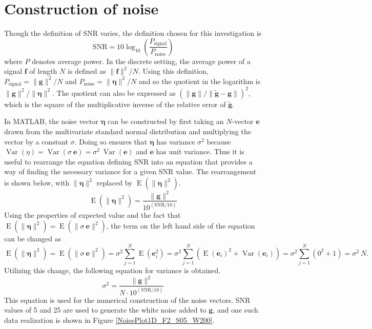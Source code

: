 \documentclass[12pt]{book}
\newcommand{\gVec}{\mathbf{g}}	%
\newcommand{\gnoiseVec}{\widetilde{\mathbf{g}}}	%
\newcommand{\noise}{\eta}	%
\newcommand{\noiseSD}{\sigma}	%
\newcommand{\noiseVec}{\bm{\noise}}	%
\DeclareMathOperator{\Var}{Var}	%
\DeclareMathOperator{\E}{E}	%
\begin{document}
\section{Construction of noise} \label{sec:Construction of noise}

Though the definition of SNR varies, the definition chosen for this investigation is
\begin{equation}
\label{eq:SNR}
\text{SNR} = 10\log_{10}\left(\frac{P_{\text{signal}}}{P_{\text{noise}}}\right)
\end{equation}
where $P$ denotes average power. In the discrete setting, the average power of a signal $\mathbf{f}$ of length $N$ is defined as $\|\mathbf{f}\|^2/N$. Using this definition, $P_{\text{signal}} = \|\gVec\|^2/N$ and $P_{\text{noise}} = \|\noiseVec\|^2/N$ and so the quotient in the logarithm is $\|\gVec\|^2/\|\noiseVec\|^2$. The quotient can also be expressed as $(\|\gVec\|/\|\gnoiseVec - \gVec\|)^2$, which is the square of the multiplicative inverse of the relative error of $\gnoiseVec$. \par
In MATLAB, the noise vector $\noiseVec$ can be constructed by first taking an $N$-vector $\mathbf{e}$ drawn from the multivariate standard normal distribution and multiplying the vector by a constant $\noiseSD$. Doing so ensures that $\noiseVec$ has variance $\noiseSD^2$ because $\Var(\noise) = \Var(\noiseSD\:\mathbf{e}) = \noiseSD^2\:\Var(\mathbf{e})$ and $\mathbf{e}$ has unit variance. Thus it is useful to rearrange the equation defining SNR into an equation that provides a way of finding the necessary variance for a given SNR value. The rearrangement is shown below, with $\|\noiseVec\|^2$ replaced by $\E(\|\noiseVec\|^2)$.
\[\E(\|\noiseVec\|^2) = \frac{\|\gVec\|^2}{10^{(\text{SNR}/10)}}\]
Using the properties of expected value and the fact that $\E(\|\noiseVec\|^2) = \E(\|\noiseSD\:\mathbf{e}\|^2)$, the term on the left hand side of the equation can be changed as
\[\E(\|\noiseVec\|^2) = \E(\|\noiseSD\:\mathbf{e}\|^2) = \noiseSD^2 \sum_{j=1}^N \E(\mathbf{e}_i^2) = \noiseSD^2 \sum_{j=1}^N \left(\E(\mathbf{e}_i)^2 + \Var(\mathbf{e}_i)\right) = \noiseSD^2 \sum_{j=1}^N \left(0^2 + 1\right) = \noiseSD^2\:N.\]
Utilizing this change, the following equation for variance is obtained.
\begin{equation}
\label{eq:Var}
\noiseSD^2 = \frac{\|\gVec\|^2}{N \cdot 10^{(\text{SNR}/10)}}
\end{equation}
This equation is used for the numerical construction of the noise vectors. SNR values of 5 and 25 are used to generate the white noise added to $\gVec$, and one such data realization is shown in Figure \ref{NoisePlot1D_F2_S05_W200}. \par
\end{document}
